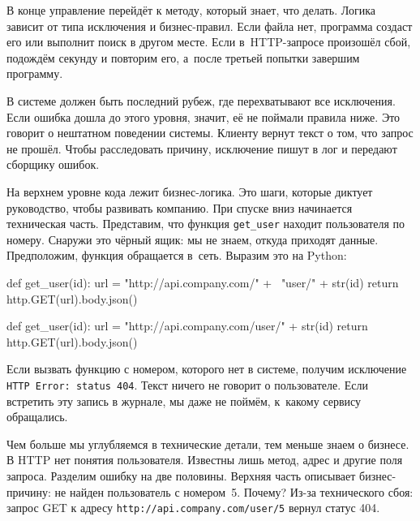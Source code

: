 В конце управление перейдёт к методу, который знает, что делать. Логика зависит
от типа исключения и бизнес-правил. Если файла нет, программа создаст его или
выполнит поиск в другом месте. Если в~HTTP-запросе произошёл сбой, подождём
секунду и повторим его, а~после третьей попытки завершим программу.

В системе должен быть последний рубеж, где перехватывают все исключения. Если
ошибка дошла до этого уровня, значит, её не поймали правила ниже. Это говорит о
нештатном поведении системы. Клиенту вернут текст о том, что запрос не
прошёл. Чтобы расследовать причину, исключение пишут в лог и передают сборщику
ошибок.

На верхнем уровне кода лежит бизнес-логика. Это шаги, которые диктует
руководство, чтобы развивать компанию. При спуске вниз начинается техническая
часть. Представим, что функция \verb|get_user| находит пользователя по
номеру. Снаружи это чёрный ящик: мы не знаем, откуда приходят
данные. Предположим, функция обращается в~сеть. Выразим это на Python:

\ifx\DEVICETYPE\MOBILE

\begin{english}
  \begin{python}
def get_user(id):
  url = "http://api.company.com/" + \
        "user/" + str(id)
  return http.GET(url).body.json()
  \end{python}
\end{english}

\else

\begin{english}
  \begin{python}
def get_user(id):
  url = "http://api.company.com/user/" + str(id)
  return http.GET(url).body.json()
  \end{python}
\end{english}

\fi

Если вызвать функцию с номером, которого нет в системе, получим исключение
\verb|HTTP Error: status 404|. Текст ничего не говорит о пользователе. Если
встретить эту запись в журнале, мы даже не поймём, к~какому сервису обращались.

Чем больше мы углубляемся в технические детали, тем меньше знаем о бизнесе. В
HTTP нет понятия пользователя. Известны лишь метод, адрес и другие поля
запроса. Разделим ошибку на две половины. Верхняя часть описывает бизнес-причину:
не найден пользователь с номером~5. Почему? Из-за технического сбоя: запрос GET
к адресу \verb|http://api.company.com/user/5| вернул статус 404.

